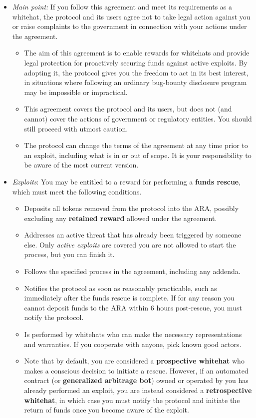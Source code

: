 \documentclass{article}
\begin{document}
\begin{itemize}
    \item \textit{Main point:} If you follow this agreement and meet its requirements as a whitehat, the protocol and its users agree not to take legal action against you or raise complaints to the government in connection with your actions under the agreement.
          \begin{itemize}
              \item The aim of this agreement is to enable rewards for whitehats and provide legal protection for proactively securing funds against active exploits. By adopting it, the protocol gives you the freedom to act in its best interest, in situations where following an ordinary bug-bounty disclosure program may be impossible or impractical.
              \item This agreement covers the protocol and its users, but does not (and cannot) cover the actions of government or regulatory entities. You should still proceed with utmost caution.
              \item The protocol can change the terms of the agreement at any time prior to an exploit, including what is in or out of scope. It is your responsibility to be aware of the most current version.
          \end{itemize}

    \item \textit{Exploits}: You may be entitled to a reward for performing a \textbf{funds rescue}, which must meet the following conditions.
          \begin{itemize}
              \item Deposits all tokens removed from the protocol into the ARA, possibly excluding any \textbf{retained reward} allowed under the agreement.
              \item Addresses an active threat that has already been triggered by someone else. Only \textit{active exploits} are covered \- you are not allowed to start the process, but you can finish it.
              \item Follows the specified process in the agreement, including any addenda.
              \item Notifies the protocol as soon as reasonably practicable, such as immediately after the funds rescue is complete. If for any reason you cannot deposit funds to the ARA within 6 hours post-rescue, you must notify the protocol.
              \item Is performed by whitehats who can make the necessary representations and warranties. If you cooperate with anyone, pick known good actors.
              \item Note that by default, you are considered a \textbf{prospective whitehat} who makes a conscious decision to initiate a rescue. However, if an automated contract (or \textbf{generalized arbitrage bot}) owned or operated by you has already performed an exploit, you are instead considered a \textbf{retrospective whitehat}, in which case you must notify the protocol and initiate the return of funds once you become aware of the exploit.
          \end{itemize}


\end{itemize}
\end{document}

